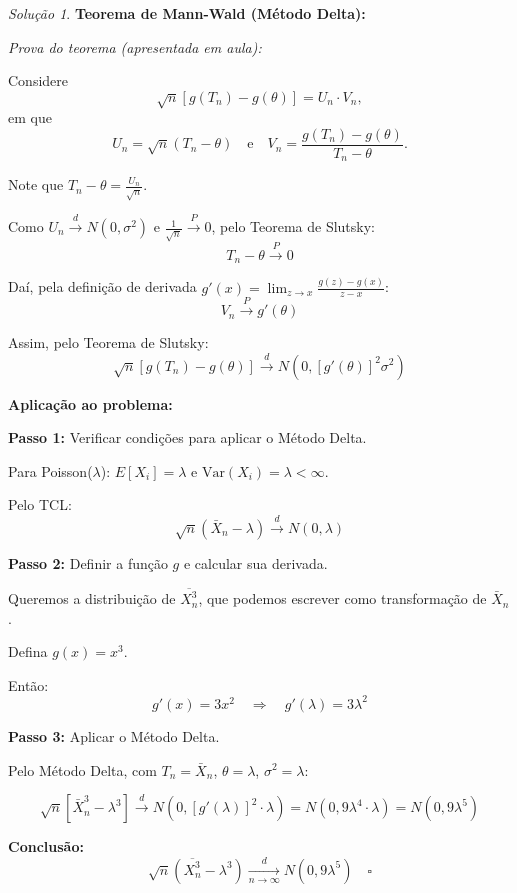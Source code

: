 \documentclass[12pt,a4paper]{article}
\theoremstyle{definition}
\theoremstyle{remark}
\newtheorem{solucao}{Solução}[section]
\begin{document}
\begin{solucao}
\textbf{Teorema de Mann-Wald (Método Delta):}

\textit{Prova do teorema (apresentada em aula):}

Considere
\[
\sqrt{n} \left[ g(T_n) - g(\theta) \right] = U_n \cdot V_n,
\]
em que
\[
U_n = \sqrt{n} (T_n - \theta) \quad \text{e} \quad V_n = \frac{g(T_n) - g(\theta)}{T_n - \theta}.
\]

Note que $T_n - \theta = \frac{U_n}{\sqrt{n}}$.

Como $U_n \xrightarrow{d} N(0, \sigma^2)$ e $\frac{1}{\sqrt{n}} \xrightarrow{P} 0$, pelo Teorema de Slutsky:
\[
T_n - \theta \xrightarrow{P} 0
\]

Daí, pela definição de derivada $g'(x) = \lim_{z \to x} \frac{g(z) - g(x)}{z - x}$:
\[
V_n \xrightarrow{P} g'(\theta)
\]

Assim, pelo Teorema de Slutsky:
\[
\sqrt{n} \left[ g(T_n) - g(\theta) \right] \xrightarrow{d} N\left(0, \left[ g'(\theta) \right]^2 \sigma^2 \right)
\]

\textbf{Aplicação ao problema:}

\textbf{Passo 1:} Verificar condições para aplicar o Método Delta.

Para Poisson($\lambda$): $E[X_i] = \lambda$ e $\text{Var}(X_i) = \lambda < \infty$.

Pelo TCL:
\[
\sqrt{n}(\bar{X}_n - \lambda) \xrightarrow{d} N(0, \lambda)
\]

\textbf{Passo 2:} Definir a função $g$ e calcular sua derivada.

Queremos a distribuição de $\overline{X_n^3}$, que podemos escrever como transformação de $\bar{X}_n$.

Defina $g(x) = x^3$.

Então:
\[
g'(x) = 3x^2 \quad \Rightarrow \quad g'(\lambda) = 3\lambda^2
\]

\textbf{Passo 3:} Aplicar o Método Delta.

Pelo Método Delta, com $T_n = \bar{X}_n$, $\theta = \lambda$, $\sigma^2 = \lambda$:

\[
\sqrt{n}\left[\bar{X}_n^3 - \lambda^3\right] \xrightarrow{d} N\left(0, [g'(\lambda)]^2 \cdot \lambda\right) = N\left(0, 9\lambda^4 \cdot \lambda\right) = N(0, 9\lambda^5)
\]

\textbf{Conclusão:}
\[
\sqrt{n} \left( \overline{X_n^3} - \lambda^3 \right) \xrightarrow[n \to \infty]{d} N(0, 9\lambda^5) \quad \square
\]
\end{solucao}
\end{document}

